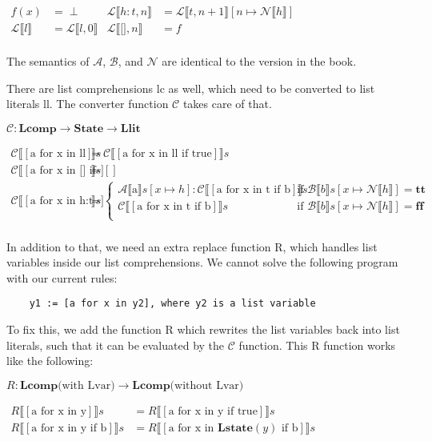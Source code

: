 \documentclass[12pt]{article}
\newcommand{\metavar}[1]{\textlangle#1\textrangle}
\newcommand{\dblbr}[1]{\llbracket#1\rrbracket}
\newcommand{\fancybr}[2]{#1 \dblbr{#2}}
\renewcommand{\AA}{\mathcal{A}}
\newcommand{\BB}{\mathcal{B}}
\newcommand{\CC}{\mathcal{C}}
\newcommand{\LL}{\mathcal{L}}
\newcommand{\NN}{\mathcal{N}}
\newcommand{\State}{\mathbf{State}}
\newcommand{\Lstate}{\mathbf{Lstate}}
\newcommand{\Llit}{\mathbf{Llit}}
\newcommand{\Lcomp}{\mathbf{Lcomp}}
\begin{document}
$\begin{aligned}
    f(x) &= \perp & \fancybr{\LL}{h:t, n} &= \fancybr{\LL}{t, n + 1}[n \mapsto \fancybr{\NN}{h}]\\
    \fancybr{\LL}{l} &= \fancybr{\LL}{l, 0} & \fancybr{\LL}{\texttt{[]}, n} &= f\\
\end{aligned}$

The semantics of $\AA$, $\BB$, and $\NN$ are identical to the version in the book.

There are list comprehensions \metavar{lc} as well, which need to be converted to list literals \metavar{ll}. The converter function $\CC$ takes care of that.

$\CC: \Lcomp \rightarrow \State \rightarrow \Llit$

$\begin{aligned}
    \fancybr{\CC}{[\text{a for x in ll}]} s &= \fancybr{\CC}{[\text{a for x in ll if true}]} s\\
    \fancybr{\CC}{[\text{a for x in [] if b}]} s &= []\\
    \fancybr{\CC}{[\text{a for x in h:t if b}]} s &= \begin{cases}
        \fancybr{\AA}{\text{a}} s[x \mapsto h] : \fancybr{\CC}{[\text{a for x in t if b}]} s
        & \text{if } \fancybr{\BB}{b} s[x \mapsto \fancybr{\NN}{h}] = \mathbf{tt}\\
        \fancybr{\CC}{[\text{a for x in t if b}]} s
        & \text{if } \fancybr{\BB}{b} s[x \mapsto \fancybr{\NN}{h}] = \mathbf{ff}\\
    \end{cases}\\
\end{aligned}$

In addition to that, we need an extra replace function R, which handles list variables inside our list comprehensions.
We cannot solve the following program with our current rules:
\begin{lstlisting}
    y1 := [a for x in y2], where y2 is a list variable
\end{lstlisting}

To fix this, we add the function R which rewrites the list variables back into list literals, such that it can be evaluated by the $\CC$ function.
This R function works like the following:

$R: \Lcomp \text{(with Lvar)} \rightarrow \Lcomp \text{(without Lvar)}$

$\begin{aligned}
    \fancybr{R}{[\text{a for x in y}]}s &= \fancybr{R}{[\text{a for x in y if true}]} s\\
    \fancybr{R}{[\text{a for x in y if b}]}s &= \fancybr{R}{[\text{a for x in } \Lstate(y) \text{ if b}]} s\\
\end{aligned}$
\end{document}
